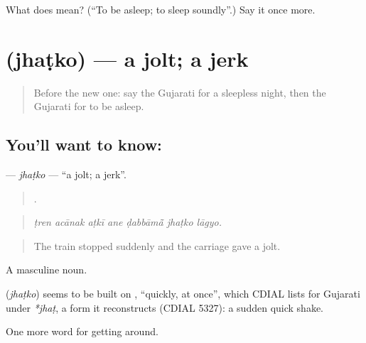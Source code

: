\begin{tcolorbox}[breakable,colback=teal!4,colframe=teal!35!black,title={Before you move on}]
What does  mean? (\textquotedblleft{}To be asleep; to sleep soundly\textquotedblright{}.) Say it once more.
\end{tcolorbox}
\section[\texorpdfstring{\gu{ઝટકો} (jhaṭko)}{ઝટકો (jhaṭko)}]{ (jhaṭko) — a jolt; a jerk}

\label{lesson:GU-C398-jhatko}



\begin{quote}
Before the new one: say the Gujarati for a sleepless night, then the Gujarati for to be asleep.
\end{quote}

\subsection*{You'll want to know: }
\textbf{} — \emph{jhaṭko} — \textquotedblleft{}a jolt; a jerk\textquotedblright{}.

\begin{quote}
      .
\end{quote}

\begin{quote}
\emph{ṭren acānak aṭkī ane ḍabbāmā̃ jhaṭko lāgyo.}
\end{quote}

\begin{quote}
The train stopped suddenly and the carriage gave a jolt.
\end{quote}

A masculine noun.

\begin{cousinweb}
\textbf{} (\emph{jhaṭko}) seems to be built on , \textquotedblleft{}quickly, at once\textquotedblright{}, which CDIAL lists for Gujarati under \emph{*jhaṭ}, a form it reconstructs (CDIAL 5327): a sudden quick shake.
\end{cousinweb}

\begin{grammarlens}[title={What you've built}]
One more word for getting around.
\end{grammarlens}

